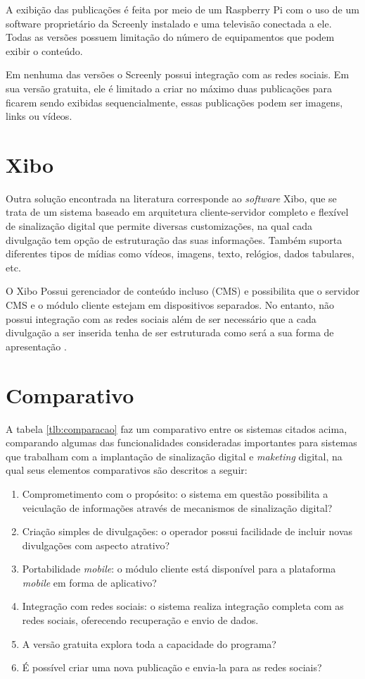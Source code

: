 A exibição das publicações é feita por meio de um Raspberry Pi com o uso de um software proprietário da Screenly instalado e uma televisão conectada a ele. Todas as versões possuem limitação do número de equipamentos que podem exibir o conteúdo.

Em nenhuma das versões o Screenly possui integração com as redes sociais. Em sua versão gratuita, ele é limitado a criar no máximo duas publicações para ficarem sendo exibidas sequencialmente, essas publicações podem ser imagens, links ou vídeos.

\section{Xibo}
Outra solução encontrada na literatura corresponde ao \textit{software} Xibo, que se trata de um sistema baseado em arquitetura cliente-servidor completo e flexível de sinalização digital que permite diversas customizações, na qual cada divulgação tem opção de estruturação das suas informações. Também suporta diferentes tipos de mídias como vídeos, imagens, texto, relógios, dados tabulares, etc. 

O Xibo Possui gerenciador de conteúdo incluso (CMS) e possibilita que o servidor CMS e o módulo cliente estejam em dispositivos separados. No entanto, não possui integração com as redes sociais além de ser necessário que a cada divulgação a ser inserida tenha de ser estruturada como será a sua forma de apresentação \cite{xibo2017}.

\section{Comparativo}
A tabela \ref{tlb:comparacao} faz um comparativo entre os sistemas citados acima, comparando algumas das funcionalidades consideradas importantes para sistemas que trabalham com a implantação de sinalização digital e \textit{maketing} digital, na qual seus elementos comparativos são descritos a seguir:
\begin{enumerate}[label=\Roman*)]
\label{tlb:comparacao}
	\item Comprometimento com o propósito: o sistema em questão possibilita a veiculação de informações através de mecanismos de sinalização digital?
	\item Criação simples de divulgações: o operador possui facilidade de incluir novas divulgações com aspecto atrativo?
	\item Portabilidade \textit{mobile}: o módulo cliente está disponível para a plataforma \textit{mobile} em forma de aplicativo?
	\item Integração com redes sociais: o sistema realiza integração completa com as redes sociais, oferecendo recuperação e envio de dados.
	\item A versão gratuita explora toda a capacidade do programa?
	\item É possível criar uma nova publicação e envia-la para as redes sociais?
\end{enumerate}

